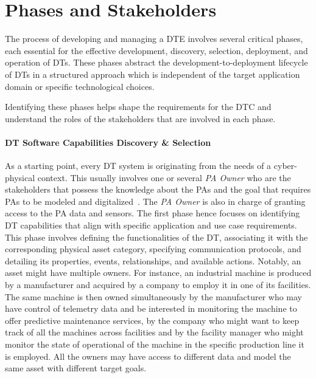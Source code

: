 \section{Phases and Stakeholders}


The process of developing and managing a \ac{DTE} involves several critical phases, each essential for the effective development, discovery, selection, deployment, and operation of \acp{DT}.
%
These phases abstract the development-to-deployment lifecycle of \acp{DT} in a structured approach which is independent of the target application domain or specific technological choices.

Identifying these phases helps shape the requirements for the \ac{DTC} and understand the roles of the stakeholders that are involved in each phase.


\paragraph{DT Software Capabilities Discovery \& Selection}
As a starting point, every DT system is originating from the needs of a cyber-physical context.
%
This usually involves one or several \emph{\ac{PA} Owner} who are the stakeholders that possess the knowledge about the \acp{PA} and the goal that requires \acp{PA} to be modeled and digitalized~\cite{michael2024software}.
The \emph{\ac{PA} Owner} is also in charge of granting access to the \ac{PA} data and sensors. 
%
The first phase hence focuses on identifying DT capabilities that align with specific application and use case requirements.
%
This phase involves defining the functionalities of the DT, associating it with the corresponding physical asset category, specifying communication protocols, and detailing its properties, events, relationships, and available actions. 
%
Notably, an asset might have multiple owners.
For instance, an industrial machine is produced by a manufacturer and acquired by a company to employ it in one of its facilities.
The same machine is then owned simultaneously by the manufacturer who may have control of telemetry data and be interested in monitoring the machine to offer predictive maintenance services, by the company who might want to keep track of all the machines across facilities and by the facility manager who might monitor the state of operational of the machine in the specific production line it is employed. 
All the owners may have access to different data and model the same asset with different target goals.


